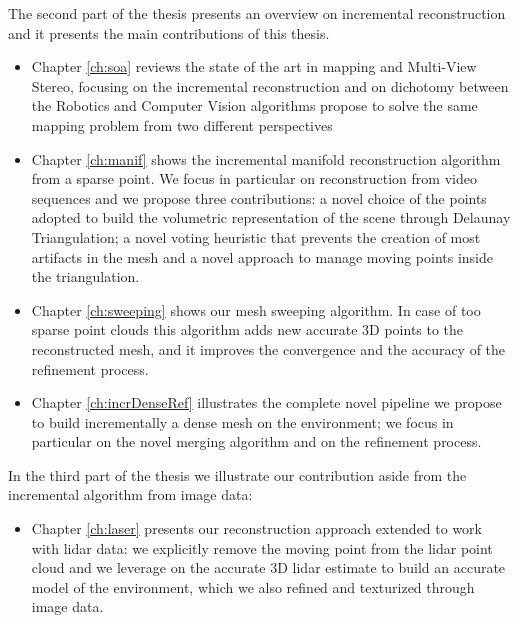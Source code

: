 
The second part of the thesis presents an overview on incremental reconstruction and it presents the main contributions of this thesis.
\begin{itemize}
 \item Chapter \ref{ch:soa} reviews the state of the art in mapping and Multi-View Stereo, focusing on the incremental reconstruction and on dichotomy between the Robotics and  Computer Vision algorithms propose to solve the same mapping problem from two different perspectives
 \item Chapter \ref{ch:manif} shows the incremental manifold reconstruction algorithm from a sparse point. We focus in particular on reconstruction from video sequences and we propose three contributions: a novel choice of the points adopted to build the volumetric representation of the scene through Delaunay Triangulation; a novel voting heuristic that prevents the creation of most artifacts in the mesh and a novel approach to manage moving points inside the triangulation.
 \item Chapter \ref{ch:sweeping} shows our mesh sweeping algorithm. In case of too sparse point clouds this algorithm adds new accurate 3D points to the reconstructed mesh, and it  improves the convergence and the accuracy of the refinement process.
 \item Chapter \ref{ch:incrDenseRef} illustrates the complete novel pipeline we propose to build incrementally a dense mesh on the environment; we focus in particular on the novel merging algorithm and on the refinement process.
\end{itemize}

In the third part of the thesis we illustrate our contribution aside from the incremental algorithm from image data:
\begin{itemize}
 \item Chapter \ref{ch:laser} presents our reconstruction approach extended to work with lidar data: we explicitly remove the moving point from the lidar point cloud and we leverage on the accurate 3D lidar estimate to build an accurate model of the environment, which we also refined and texturized through image data.
\end{itemize}





